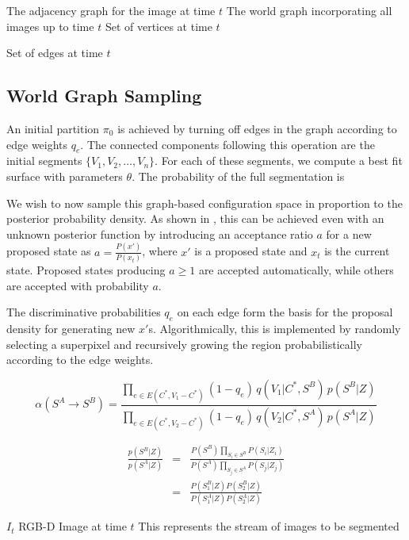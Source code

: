 \documentclass[10pt,letterpaper]{article}
\begin{document}
	 The adjacency graph for the image at time $t$
 The world graph incorporating all images up to time $t$
 Set of vertices at time $t$



Set of edges at time $t$ 
\subsection{World Graph Sampling}
	An initial partition $\pi_0$ is achieved by turning off edges in the graph according to edge weights $q_e$. The connected components following this operation are the initial segments $\{V_1,V_2,\ldots,V_n\}$. For each of these segments, we compute a best fit surface with parameters $\theta$. The probability of the full segmentation is 

	We wish to now sample this graph-based configuration space in proportion to the posterior probability density. As shown in  \cite{metropolis1953equation}, this can be achieved even with an unknown posterior function by introducing an acceptance ratio $a$ for a new proposed state as $a=\frac{P(x')}{P(x_t)}$, where $x'$ is a proposed state and $x_t$ is the current state. Proposed states producing $a\geq 1$ are accepted automatically, while others are accepted with probability $a$.
	
	The discriminative probabilities $q_e$ on each edge form the basis for the proposal density for generating new $x'$s. Algorithmically, this is implemented by randomly selecting a superpixel and recursively growing the region probabilistically according to the edge weights.

\begin{equation}
\alpha(S^{A}\rightarrow S^{B})=\frac{\prod_{e\in E(C^{*},V_{1}-C^{*})}(1-q_{e})\, q(V_{1}|C^{*},S^{B})\, p(S^{B}|Z)}{\prod_{e\in E(C^{*},V_{2}-C^{*})}(1-q_{e})\, q(V_{2}|C^{*},S^{A})\, p(S^{A}|Z)}\label{eq: acceptanceRatio}
\end{equation}

\begin{eqnarray}
\frac{p(S^{B}|Z)}{p(S^{A}|Z)} & = & \frac{P(S^{B})\prod_{S_{i}\in S^{B}}P(S_{i}|Z_{i})}{P(S^{A})\prod_{S_{j}\in S^{A}}P(S_{j}|Z_{j})}\nonumber \\
 & = & \frac{P(S_{1}^{B}|Z)P(S_{2}^{B}|Z)}{P(S_{1}^{A}|Z)P(S_{2}^{A}|Z)}\label{eq:jumpProb}
\end{eqnarray}


	$I_t$ RGB-D Image at time $t$ This represents the stream of images to be segmented
\end{document}
